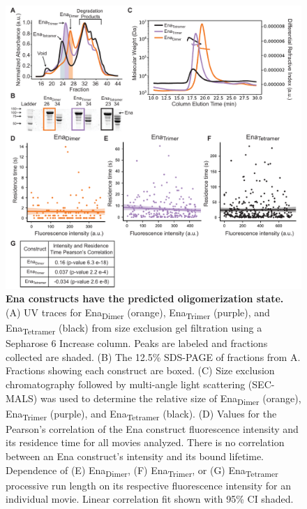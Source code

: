\begin{figure}
\centering
\includegraphics[width=16.5cm]{img/ch02/Supp_Figure_2_PNAS.pdf}
\caption[Ena constructs have the predicted oligomerization state.]{\textbf{Ena constructs have the predicted oligomerization state.} (A) UV traces for Ena\textsubscript{Dimer} (orange), Ena\textsubscript{Trimer} (purple), and Ena\textsubscript{Tetramer} (black) from size exclusion gel filtration using a Sepharose 6 Increase column. Peaks are labeled and fractions collected are shaded. (B) The 12.5\% SDS-PAGE of fractions from A. Fractions showing each construct are boxed. (C) Size exclusion chromatography followed by multi-angle light scattering (SEC-MALS) was used to determine the relative size of Ena\textsubscript{Dimer} (orange), Ena\textsubscript{Trimer} (purple), and Ena\textsubscript{Tetramer} (black). (D) Values for the Pearson's correlation of the Ena construct fluorescence intensity and its residence time for all movies analyzed. There is no correlation between an Ena construct's intensity and its bound lifetime. Dependence of (E) Ena\textsubscript{Dimer}, (F) Ena\textsubscript{Trimer}, or (G) Ena\textsubscript{Tetramer} processive run length on its respective fluorescence intensity for an individual movie. Linear correlation fit shown with 95\% CI shaded.}
\label{fig:ena-sizes}
\end{figure}

